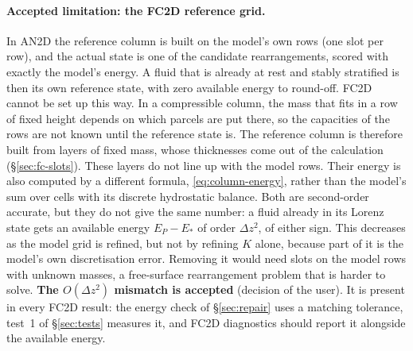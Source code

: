 \documentclass[11pt,a4paper]{article}
\begin{document}
\paragraph{Accepted limitation: the FC2D reference grid.} In AN2D the reference column is built on the model's own rows (one slot per row),
and the actual state is one of the candidate rearrangements, scored with exactly the model's energy. A fluid that is already at
rest and stably stratified is then its own reference state, with zero available energy to round-off. FC2D cannot be set up this way. In a
compressible column, the mass that fits in a row of fixed height depends on which parcels are put there, so the capacities of
the rows are not known until the reference state is. The reference column is therefore built from layers of fixed mass, whose
thicknesses come out of the calculation (\S\ref{sec:fc-slots}). These layers do not line up with the model rows. Their energy
is also computed by a different formula, \eqref{eq:column-energy}, rather than the model's sum over cells with its discrete
hydrostatic balance. Both are second-order accurate, but they do not give the same number: a fluid already in its Lorenz state
gets an available energy $E_P-E_*$ of order $\Delta z^2$, of either sign. This decreases as the model grid is refined, but not by refining $K$ alone,
because part of it is the model's own discretisation error. Removing it would need slots on the model rows with unknown
masses, a free-surface rearrangement problem that is harder to solve. \textbf{The $O(\Delta z^2)$ mismatch is accepted} (decision
of the user). It is present in every FC2D result: the energy check of \S\ref{sec:repair} uses a matching tolerance, test~1 of
\S\ref{sec:tests} measures it, and FC2D diagnostics should report it alongside the available energy.

\end{document}
